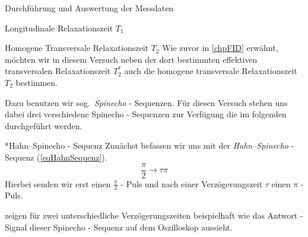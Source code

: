\documentclass[pdftex, a4paper,11pt, twoside, ngerman]{report}
\begin{document}
\begin{chapter}{Durchführung und Auswertung der Messdaten}
\begin{section}{
        Longitudinale Relaxationszeit $T_{1}$}
      
    \end{section}
    
    
    
    \begin{section}{
        Homogene Transversale Relaxationszeit $T_{2}$}
      \label{chpHomoTransRelax}
      Wie zuvor in \cref{chpFID} erwähnt, möchten wir in diesem Versuch neben
      der dort bestimmten effektiven transversalen Relaxationszeit $T_{2}^{*}$
      auch die homogene transversale Relaxationszeit $T_{2}$ bestimmen.
      
      Dazu benutzen wir sog.\ \textit{Spinecho} - Sequenzen.
      Für diesen Versuch stehen uns dabei drei verschiedene Spinecho - Sequenzen
      zur Verfügung die im folgenden durchgeführt werden.
      
      \begin{subsection}*{Hahn--Spinecho - Sequenz}
        \label{chpHomoTransRelaxHahn}
        Zunächst befassen wir uns mit der \textit{Hahn--Spinecho} - Sequenz
        (\cref{eqHahnSequenz}).
        \begin{equation}
          \label{eqHahnSequenz}
          \frac{\pi}{2} \rightarrow \tau \pi
        \end{equation}
        Hierbei senden wir erst einen $\frac{\pi}{2}$ - Puls und nach einer
        Verzögerungszeit $\tau$ einen $\pi$ - Puls.
        
         zeigen für zwei unterschiedliche
        Verzögerungszeiten beispielhaft wie das Antwort - Signal dieser
        Spinecho - Sequenz auf dem Oszilloskop aussieht.
        

\end{subsection}
\end{section}
\end{chapter}
\end{document}
